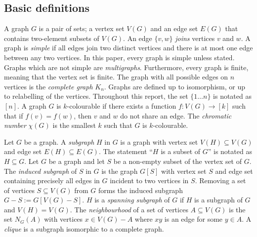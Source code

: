
\subsection{Basic definitions}\label{sec: Basic definitions}
A graph $G$ is a pair of sets; a vertex set $V(G)$ and an edge set $E(G)$ that contains two-element subsets of $V(G)$. An edge $ \{v, w\}$ \textit{joins} vertices $v$ and $w$. A graph is \textit{simple} if all edges join two distinct vertices and there is at most one edge between any two vertices. In this paper, every graph is simple unless stated. Graphs which are not simple are \textit{multigraphs}. Furthermore, every graph is finite, meaning that the vertex set is finite. The graph with all possible edges on $n$ vertices is the \textit{complete graph} $K_n$. Graphs are defined up to isomorphism, or up to relabelling of the vertices.
Throughout this report, the set $\lbrace 1\ldots n \rbrace$ is notated as $[n]$. 
A graph \(G\) is \(k\)-colourable if there exists a function \(f: V(G) \rightarrow [k]\) such that if $f(v) = f(w)$, then $v$ and $w$ do not share an edge. The \textit{chromatic number} \(\chi(G)\) is the smallest \(k\) such that \(G\) is \(k\)-colourable. 

Let $G$ be a graph. A \textit{subgraph} $H$ in $G$ is a graph with vertex set $V(H) \subseteq V(G)$ and edge set $E(H) \subseteq E(G)$. The statement ``$H$ is a subset of $G$'' is notated as $H \subseteq G$.
Let $G$ be a graph and let $S$ be a non-empty subset of the vertex set of $G$. The \textit{induced subgraph} of $S$ in $G$ is the graph $G[S]$ with vertex set $S$ and edge set containing precisely all edges in $G$ incident to two vertices in $S$. Removing a set of vertices $S \subseteq V(G)$ from $G$ forms the induced subgraph $G - S := G[V(G) - S]$. 
$H$ is a \textit{spanning subgraph} of $G$ if $H$ is a subgraph of $G$ and $V(H) = V(G)$. 
The \textit{neighbourhood} of a set of vertices $A \subseteq V(G)$ is the set $N_G(A)$ with vertices $x \in V(G) - A$ where $xy$ is an edge for some $y \in A$. A \textit{clique} is a subgraph isomorphic to a complete graph. 